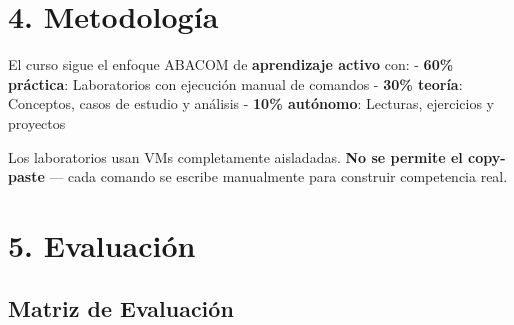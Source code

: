\documentclass[
  letterpaper,
]{report}
\begin{document}
\section{4. Metodología}\label{metodologuxeda}

El curso sigue el enfoque ABACOM de \textbf{aprendizaje activo} con: -
\textbf{60\% práctica}: Laboratorios con ejecución manual de comandos -
\textbf{30\% teoría}: Conceptos, casos de estudio y análisis -
\textbf{10\% autónomo}: Lecturas, ejercicios y proyectos

Los laboratorios usan VMs completamente aisladadas. \textbf{No se
permite el copy-paste} --- cada comando se escribe manualmente para
construir competencia real.

\section{5. Evaluación}\label{evaluaciuxf3n}

\subsection{Matriz de Evaluación}\label{matriz-de-evaluaciuxf3n}
\end{document}
